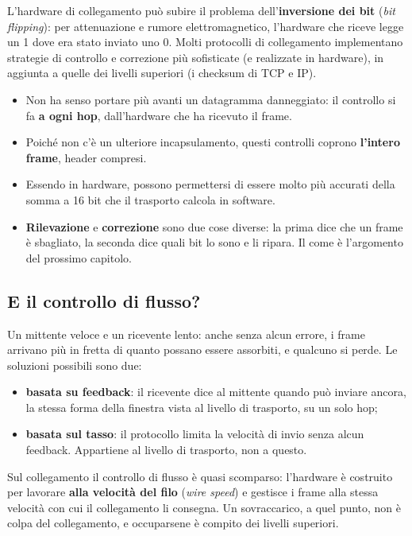 L'hardware di collegamento può subire il problema dell'\textbf{inversione dei bit} (\emph{bit flipping}): per attenuazione e
rumore elettromagnetico, l'hardware che riceve legge un 1 dove era stato inviato uno 0. Molti protocolli di collegamento
implementano strategie di controllo e correzione più sofisticate (e realizzate in hardware), in aggiunta a quelle dei livelli
superiori (i checksum di TCP e IP).

\begin{itemize}
    \item Non ha senso portare più avanti un datagramma danneggiato: il controllo si fa \textbf{a ogni hop}, dall'hardware che ha
          ricevuto il frame.
    \item Poiché non c'è un ulteriore incapsulamento, questi controlli coprono \textbf{l'intero frame}, header compresi.
    \item Essendo in hardware, possono permettersi di essere molto più accurati della somma a 16 bit che il trasporto calcola in
          software.
    \item \textbf{Rilevazione} e \textbf{correzione} sono due cose diverse: la prima dice che un frame è sbagliato, la seconda dice
          quali bit lo sono e li ripara. Il come è l'argomento del prossimo capitolo.
\end{itemize}

\subsection{E il controllo di flusso?}

Un mittente veloce e un ricevente lento: anche senza alcun errore, i frame arrivano più in fretta di quanto possano essere
assorbiti, e qualcuno si perde. Le soluzioni possibili sono due:

\begin{itemize}
    \item \textbf{basata su feedback}: il ricevente dice al mittente quando può inviare ancora, la stessa forma della finestra vista
          al livello di trasporto, su un solo hop;
    \item \textbf{basata sul tasso}: il protocollo limita la velocità di invio senza alcun feedback. Appartiene al livello di
          trasporto, non a questo.
\end{itemize}

Sul collegamento il controllo di flusso è quasi scomparso: l'hardware è costruito per lavorare \textbf{alla velocità del filo}
(\emph{wire speed}) e gestisce i frame alla stessa velocità con cui il collegamento li consegna. Un sovraccarico, a quel punto, non
è colpa del collegamento, e occuparsene è compito dei livelli superiori.

